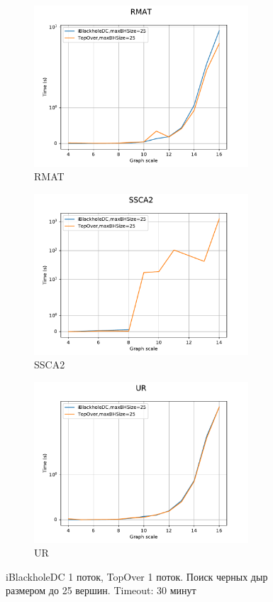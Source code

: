 \documentclass[12pt,a4paper,oneside,openany]{article}
\theoremstyle{definition}
\theoremstyle{lemma}
\theoremstyle{remark}
\begin{document}
\begin{figure}[H]
    \begin{subfigure}{.5\textwidth}
      \centering
      \includegraphics[width=8cm]{images/2_RMAT.pdf}
      \caption{RMAT}
      \label{fig:topochi:rmat}
    \end{subfigure}
    \begin{subfigure}{.5\textwidth}
      \centering
      \includegraphics[width=8cm]{images/2_SSCA2.pdf}
      \caption{SSCA2}
      \label{fig:topochi:ssca}
    \end{subfigure}
    \begin{subfigure}{.5\textwidth}
      \centering
      \includegraphics[width=8cm]{images/2_UR.pdf}
      \caption{UR}
      \label{fig:topochi:ur}
    \end{subfigure}
    \caption{iBlackholeDC 1 поток, TopOver 1 поток. Поиск черных дыр размером до 25 вершин. Timeout: 30 минут}
    \label{fig:topochi}
\end{figure}
\end{document}
